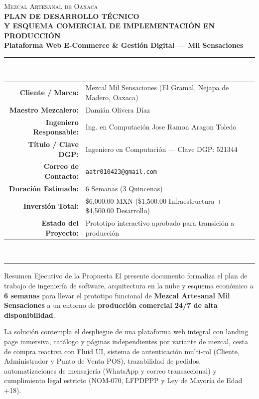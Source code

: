 \documentclass[11pt,letterpaper]{article}
\begin{document}
\begin{center}
    {\scshape\Large Mezcal Artesanal de Oaxaca}\\[0.2cm]
    {\Huge\textbf{\color{MezcalAgave}PLAN DE DESARROLLO TÉCNICO}}\\[0.15cm]
    {\Large\textbf{\color{MezcalGold}Y ESQUEMA COMERCIAL DE IMPLEMENTACIÓN EN PRODUCCIÓN}}\\[0.3cm]
    {\large\textbf{Plataforma Web E-Commerce \& Gestión Digital — Mil Sensaciones}}\\[0.4cm]
    \rule{0.85\textwidth}{1.5pt}\\[0.3cm]
    \begin{tabular}{rl}
        \textbf{Cliente / Marca:} & Mezcal Mil Sensaciones (El Gramal, Nejapa de Madero, Oaxaca) \\
        \textbf{Maestro Mezcalero:} & Damián Olivera Díaz \\
        \textbf{Ingeniero Responsable:} & Ing. en Computación Jose Ramon Aragon Toledo \\
        \textbf{Título / Clave DGP:} & Ingeniero en Computación — Clave DGP: 521344 \\
        \textbf{Correo de Contacto:} & \texttt{aatr010423@gmail.com} \\
        \textbf{Duración Estimada:} & 6 Semanas (3 Quincenas) \\
        \textbf{Inversión Total:} & \$6,000.00 MXN (\$1,500.00 Infraestructura + \$4,500.00 Desarrollo) \\
        \textbf{Estado del Proyecto:} & Prototipo interactivo aprobado para transición a producción
    \end{tabular}
    \\[0.3cm]
    \rule{0.85\textwidth}{1.5pt}
\end{center}

\vspace{0.3cm}

\begin{resumenbox}{Resumen Ejecutivo de la Propuesta}
El presente documento formaliza el plan de trabajo de ingeniería de software, arquitectura en la nube y esquema económico a \textbf{6 semanas} para llevar el prototipo funcional de \textbf{Mezcal Artesanal Mil Sensaciones} a un entorno de \textbf{producción comercial 24/7 de alta disponibilidad}.

La solución contempla el despliegue de una plataforma web integral con landing page inmersiva, catálogo y páginas independientes por variante de mezcal, cesta de compra reactiva con Fluid UI, sistema de autenticación multi-rol (Cliente, Administrador y Punto de Venta POS), trazabilidad de pedidos, automatizaciones de mensajería (WhatsApp y correo transaccional) y cumplimiento legal estricto (NOM-070, LFPDPPP y Ley de Mayoría de Edad +18).
\end{resumenbox}
\end{document}
